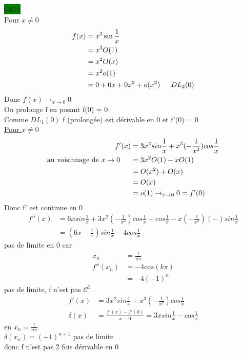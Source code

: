 \documentclass{article}
\begin{document}
 \noindent
\colorbox{green}{630.2}\\
Pour \(x \neq 0\) \begin{align*}
    f(x) &= x^3 \sin \frac{1}{x}\\
    &= x^3O(1)\\
    &= x^2O(x)\\
    &= x^2o(1)\\
    &= 0 + 0x + 0x^2 + o(x^2) \indent DL_2(0)
\end{align*}
Donc \(f(x) \rightarrow_{x \to 0} 0\)\\
On prolonge f en posant f(0) = 0\\
Comme \(DL_1(0)\) f (prolongée) est dérivable en 0 et f'(0) = 0\\

\noindent \underline{Pour \(x \neq 0\)} \begin{align*}
    f'(x) &= 3x^2sin\frac{1}{x} + x^3(-\frac{1}{x^2})cos\frac{1}{x}\\
    \text{au voisinnage de \(x \to 0\)} \indent &= 3x^2O(1) - xO(1)\\
    &= O(x^2) + O(x)\\
    &= O(x)\\
    &= o(1) \rightarrow_{x\to 0} 0 = f'(0)
\end{align*}
Donc f' est continue en 0\begin{align*}
    f''(x) &= 6xsin\frac{1}{x} + 3x^2(-\frac{1}{x^2})cos\frac{1}{x}-cos\frac{1}{x} - x(-\frac{1}{x^2})(-)sin\frac{1}{x}\\
    &= (6x-\frac{1}{x})sin\frac{1}{x} - 4cos\frac{1}{x}
\end{align*}
pas de limite en 0 car \begin{align*}
    x_n &= \frac{1}{n\pi}\\
    f''(x_n) &= -4cos(k\pi)\\
    &= -4(-1)^n
\end{align*}
pas de limite, f n'est pas \(\mathcal{C}^2\)\\
\begin{align*}
    f'(x) &= 3x^2sin\frac{1}{x} + x^3(-\frac{1}{x^2})cos\frac{1}{x}\\
    \delta(x)  &= \frac{f'(x)-f'(0)}{x-0} = 3xsin\frac{1}{x}-cos\frac{1}{x}
\end{align*}
en \(x_n = \frac{1}{n\pi}\)\\
\(\delta(x_n) = (-1)^{n+1}\) pas de limite\\
donc f n'est pas 2 fois dérivable en 0\\
\end{document}
